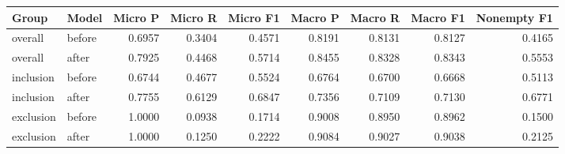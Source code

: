 \begin{tabular}{llrrrrrrr}
\toprule
Group & Model & Micro P & Micro R & Micro F1 & Macro P & Macro R & Macro F1 & Nonempty F1 \\
\midrule
overall & before & 0.6957 & 0.3404 & 0.4571 & 0.8191 & 0.8131 & 0.8127 & 0.4165 \\
overall & after & 0.7925 & 0.4468 & 0.5714 & 0.8455 & 0.8328 & 0.8343 & 0.5553 \\
inclusion & before & 0.6744 & 0.4677 & 0.5524 & 0.6764 & 0.6700 & 0.6668 & 0.5113 \\
inclusion & after & 0.7755 & 0.6129 & 0.6847 & 0.7356 & 0.7109 & 0.7130 & 0.6771 \\
exclusion & before & 1.0000 & 0.0938 & 0.1714 & 0.9008 & 0.8950 & 0.8962 & 0.1500 \\
exclusion & after & 1.0000 & 0.1250 & 0.2222 & 0.9084 & 0.9027 & 0.9038 & 0.2125 \\
\bottomrule
\end{tabular}
